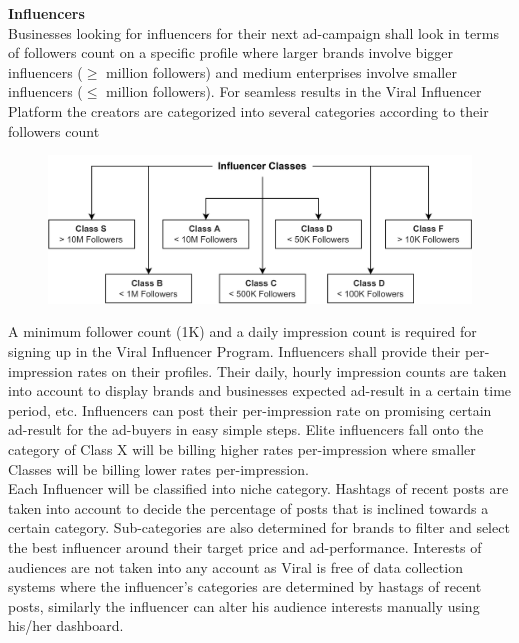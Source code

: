 \documentclass[conference]{IEEEtran}
\begin{document}
\textbf{Influencers}\\

Businesses looking for influencers for their next ad-campaign shall look in terms of followers count on a specific profile where larger brands involve bigger influencers ($\geq$ million followers) and medium enterprises involve smaller influencers ($\leq$ million followers). For seamless results in the Viral Influencer Platform the creators are categorized into several categories according to their followers count

\begin{figure}
\begin{center}
\includegraphics[width=12cm]{influencer-class}
\end{center}
\end{figure}

A minimum follower count (1K) and a daily impression count is required for signing up in the Viral Influencer Program. Influencers shall provide their per-impression rates on their profiles. Their daily, hourly impression counts are taken into account to display brands and businesses expected ad-result in a certain time period, etc. Influencers can post their per-impression rate on promising certain ad-result for the ad-buyers in easy simple steps. Elite influencers fall onto the category of Class X will be billing higher rates per-impression where smaller Classes will be billing lower rates per-impression. \\

Each Influencer will be classified into niche category. Hashtags of recent posts are taken into account to decide the percentage of posts that is inclined towards a certain category. Sub-categories are also determined for brands to filter and select the best influencer around their target price and ad-performance. Interests of audiences are not taken into any account as Viral is free of data collection systems where the influencer's categories are determined by hastags of recent posts, similarly the influencer can alter his audience interests manually using his/her dashboard.\\
\end{document}

